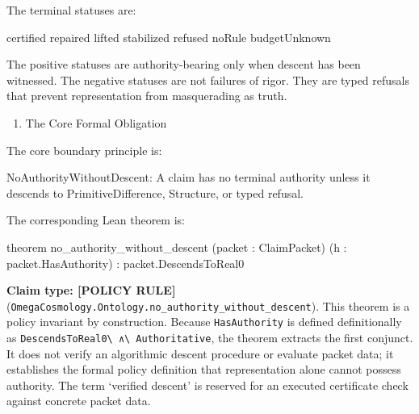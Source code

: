 \documentclass[
  10pt,
]{article}
\newenvironment{Shaded}{}{}
\newcommand{\NormalTok}[1]{#1}
\providecommand{\tightlist}{%
  \setlength{\itemsep}{0pt}\setlength{\parskip}{0pt}}
\providecommand{\tightlist}{%
  \setlength{\itemsep}{0pt}\setlength{\parskip}{0pt}}
\DeclareRobustCommand{\texttt}[1]{{\paperSymbolFont\nolinkurl{#1}}}
\begin{document}
The terminal statuses are:

\begin{Shaded}
\begin{Highlighting}[]
\NormalTok{certified}
\NormalTok{repaired}
\NormalTok{lifted}
\NormalTok{stabilized}
\NormalTok{refused}
\NormalTok{noRule}
\NormalTok{budgetUnknown}
\end{Highlighting}
\end{Shaded}

The positive statuses are authority-bearing only when descent has been witnessed. The negative statuses are not failures of rigor. They are typed refusals that prevent representation from masquerading as truth.

\begin{enumerate}
\def\labelenumi{\arabic{enumi}.}
\setcounter{enumi}{5}
\tightlist
\item
  The Core Formal Obligation
\end{enumerate}

The core boundary principle is:

\begin{Shaded}
\begin{Highlighting}[]
\NormalTok{NoAuthorityWithoutDescent:}
\NormalTok{  A claim has no terminal authority unless it descends to}
\NormalTok{  PrimitiveDifference, Structure, or typed refusal.}
\end{Highlighting}
\end{Shaded}

The corresponding Lean theorem is:

\begin{Shaded}
\begin{Highlighting}[]
\NormalTok{theorem no\_authority\_without\_descent}
\NormalTok{    (packet : ClaimPacket)}
\NormalTok{    (h : packet.HasAuthority) :}
\NormalTok{    packet.DescendsToReal0}
\end{Highlighting}
\end{Shaded}

\textbf{Claim type: {[}POLICY RULE{]}} (\texttt{OmegaCosmology.Ontology.no\_authority\_without\_descent}). This theorem is a policy invariant by construction. Because \texttt{HasAuthority} is defined definitionally as \texttt{DescendsToReal0\ ∧\ Authoritative}, the theorem extracts the first conjunct. It does not verify an algorithmic descent procedure or evaluate packet data; it establishes the formal policy definition that representation alone cannot possess authority. The term `verified descent' is reserved for an executed certificate check against concrete packet data.
\end{document}
